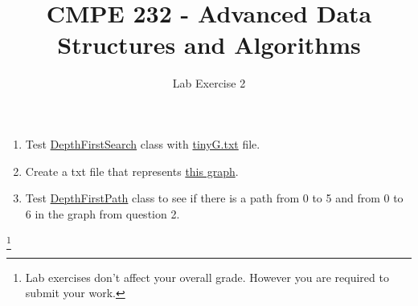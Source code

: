 \documentclass{article}
\newcommand\blfootnote[1]{%
  \begingroup
  \renewcommand\thefootnote{}\footnote{#1}%
  \addtocounter{footnote}{-1}%
  \endgroup
}
\begin{document}
\author{Lab Exercise 2}
\title{CMPE 232 - Advanced Data Structures and Algorithms}




\date{}
\maketitle
\setcounter{secnumdepth}{0}
\begin{enumerate}
\item Test \href{https://github.com/uzay00/CMPE232/blob/master/Lecture2/DepthFirstSearch.java}{DepthFirstSearch} class with \href{https://github.com/uzay00/CMPE232/blob/master/Lecture2/tinyG.txt}{tinyG.txt} file.
\item Create a txt file that represents \href{https://github.com/uzay00/CMPE232/blob/master/Lab2/DFS.png}{this graph}.
\item Test \href{https://github.com/uzay00/CMPE232/blob/master/Lecture2/DepthFirstSearch.java}{DepthFirstPath} class to see if there is a path from 0 to 5 and from 0 to 6 in the graph from question 2. 
\end{enumerate}


\blfootnote{Lab exercises don't affect your overall grade. However you are required to submit your work.}
\end{document}
